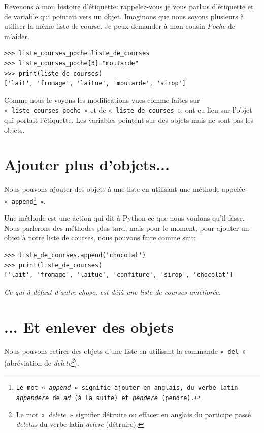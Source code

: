 Revenons à mon histoire d'étiquette: rappelez-vous je vous parlais d'étiquette et de variable qui pointait vers un objet. Imaginons que nous soyons plusieurs à utiliser la même liste de course. Je peux demander à mon cousin \emph{Poche} de m'aider.

\begin{Verbatim}[frame=single,rulecolor=\color{mbleu}, label=à taper]
>>> liste_courses_poche=liste_de_courses
>>> liste_courses_poche[3]="moutarde"
>>> print(liste_de_courses)
['lait', 'fromage', 'laitue', 'moutarde', 'sirop']
\end{Verbatim}

Comme nous le voyons les modifications vues comme faites sur «~\texttt{liste\_courses\_poche}~» et de «~\texttt{liste\_de\_courses}~», ont eu lieu sur l'objet qui portait l'étiquette. Les variables pointent sur des objets mais ne sont pas les objets.

\section*{Ajouter plus d'objets...}

Nous pouvons ajouter des objets à une liste en utilisant une méthode appelée «~\texttt{append\footnote{Le mot «~\emph{append}~» signifie ajouter en anglais, du verbe latin \emph{appendere} de \emph{ad} (à la suite) et \emph{pendere} (pendre).}}~».

Une méthode est une action qui dit à Python ce que nous voulons qu'il fasse. Nous parlerons des méthodes plus tard, mais pour le moment, pour ajouter un objet à notre liste de courses, nous pouvons faire comme suit:

\begin{Verbatim}[frame=single,rulecolor=\color{mbleu}, label=à taper]
>>> liste_de_courses.append('chocolat')
>>> print(liste_de_courses)
['lait', 'fromage', 'laitue', 'confiture', 'sirop', 'chocolat']
\end{Verbatim}


\emph{Ce qui à défaut d'autre chose, est déjà une liste de courses améliorée.}\\

\section*{... Et enlever des objets}
Nous pouvons retirer des objets d'une liste en utilisant la commande «~\texttt{del}~» (abréviation de \emph{delete\footnote{Le mot «~\emph{delete}~» signifier détruire ou effacer en anglais du participe passé \emph{deletus} du verbe latin \emph{delere} (détruire).}}).


